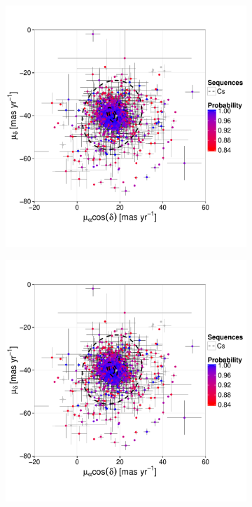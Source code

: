 \begin{figure}[ht!]
    \centering
    \begin{subfigure}[t]{0.45\textwidth}
    \centering
       \includegraphics[page=2,width=\textwidth]{background/Figures/BHM/Cs_members.pdf}
        \caption{}
    \end{subfigure}
    \begin{subfigure}[t]{0.45\textwidth}
    \centering
     \includegraphics[page=3,width=\textwidth]{background/Figures/BHM/Cs_members.pdf}

\end{subfigure}
\end{figure}
